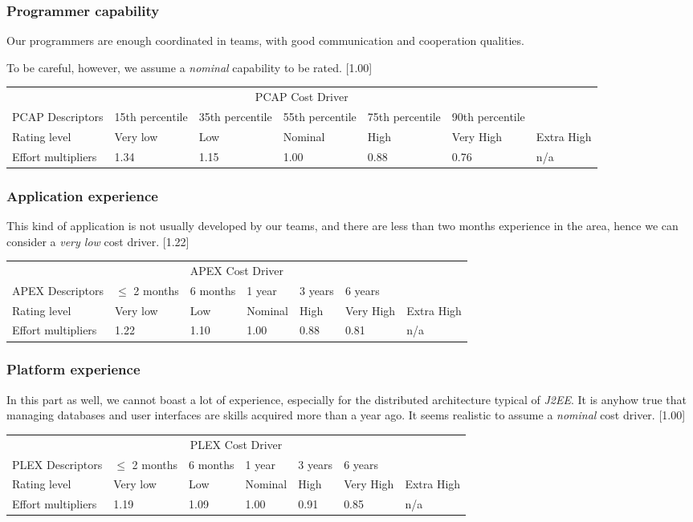 \documentclass{scrreprt}
\newcommand{\costdescriptors}[7]{
	#1 & #2 & #3 & #4 & #5 & #6 & #7\\
}
\newcommand{\ratinglevel}[6]{
	Rating level & #1 & #2 & #3 & #4 & #5 & #6 \\\hline
}
\newcommand{\effortmultipliers}[6]{
	Effort multipliers & #1 & #2 & #3 & #4 & #5 & #6 \\\hline
}
\newenvironment{costdriverstable}[1]{
	\setlength{\LTleft}{-40pt}
	\begin{longtable}{|p{\dimexpr.16\textwidth}|p{\dimexpr.14\textwidth}|p{\dimexpr.14\textwidth}|p{\dimexpr.14\textwidth}|p{\dimexpr.14\textwidth}|p{\dimexpr.14\textwidth}|p{\dimexpr.14\textwidth}|}
	\hline
	\multicolumn{7}{|c|}{{#1}}\\\hhline{|=======|}
}{
	\hline\end{longtable}
}
\begin{document}
\subsubsection{Programmer capability}
Our programmers are enough coordinated in teams, with good communication and cooperation qualities.

To be careful, however, we assume a \emph{nominal} capability to be rated. [1.00]
	
		\begin{costdriverstable}{PCAP Cost Driver}
		\costdescriptors{PCAP Descriptors}{15th percentile}{35th percentile}{55th percentile}{75th percentile}{90th percentile}{}\hline
		\ratinglevel{Very low}{Low}{Nominal}{High}{Very High}{Extra High}
		\effortmultipliers{1.34}{1.15}{\cellcolor[gray]{0.75}1.00}{0.88}{0.76}{n/a}	
	\end{costdriverstable}
	
\subsubsection{Application experience}
This kind of application is not usually developed by our teams, and there are less than two months experience in the area, hence we can consider a \emph{very low} cost driver. [1.22]
	
		\begin{costdriverstable}{APEX Cost Driver}
		\costdescriptors{APEX Descriptors}{$\le$ 2 months}{6 months}{1 year}{3 years}{6 years}{}\hline
		\ratinglevel{Very low}{Low}{Nominal}{High}{Very High}{Extra High}
		\effortmultipliers{\cellcolor[gray]{0.75}1.22}{1.10}{1.00}{0.88}{0.81}{n/a}
	\end{costdriverstable}
	
\subsubsection{Platform experience}
In this part as well, we cannot boast a lot of experience, especially for the distributed architecture typical of \emph{J2EE}. It is anyhow true that managing databases and user interfaces are skills acquired more than a year ago.
It seems realistic to assume a \emph{nominal} cost driver. [1.00]

		\begin{costdriverstable}{PLEX Cost Driver}
		\costdescriptors{PLEX Descriptors}{$\le$ 2 months}{6 months}{1 year}{3 years}{6 years}{}\hline
		\ratinglevel{Very low}{Low}{Nominal}{High}{Very High}{Extra High}
		\effortmultipliers{1.19}{1.09}{\cellcolor[gray]{0.75}1.00}{0.91}{0.85}{n/a}
	\end{costdriverstable}
	
\end{document}
